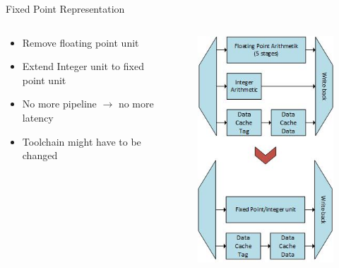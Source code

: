 \documentclass{beamer}
\begin{document}
\begin{frame}{Fixed Point Representation}
\begin {columns}
 \begin{column}{0.5\textwidth}
 
    \begin{itemize}
        \item<1->Remove floating point unit
        \item<2->Extend Integer unit to fixed point unit
        \item<3->No more pipeline $\rightarrow$ no more latency
        \item<4->Toolchain might have to be changed
    \end{itemize}
    
 \end{column}
 \begin{column}{0.5\textwidth}
    \begin{figure}
     \includegraphics[height=0.75\textheight]{img/FixedPonitRepresentation.jpg}
    \end{figure}
  \end{column}
\end {columns}
\end{frame}
\end{document}
